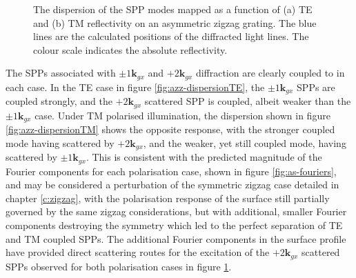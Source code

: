 \begin{figure}
\begin{center}
\end{center}
\caption[The dispersion of the SPP modes mapped as a function of TE and TM reflectivity on an asymmetric zigzag grating.]{The dispersion of the SPP modes mapped as a function of (a) TE and (b) TM reflectivity on an asymmetric zigzag grating. The blue lines are the calculated positions of the diffracted light lines. The colour scale indicates the absolute reflectivity.\label{fig:azz-dispersion}}
\end{figure}

The SPPs associated with $\pm1\mathbf{k}_{gx}$ and $+2\mathbf{k}_{gx}$ diffraction are clearly coupled to in each case. In the TE case in figure \ref{fig:azz-dispersionTE}, the $\pm1\mathbf{k}_{gx}$ SPPs are coupled strongly, and the $+2\mathbf{k}_{gx}$ scattered SPP is coupled, albeit weaker than the  $\pm1\mathbf{k}_{gx}$ case. Under TM polarised illumination, the dispersion shown in figure \ref{fig:azz-dispersionTM} shows the opposite response, with the stronger coupled mode having scattered by $+2\mathbf{k}_{gx}$, and the weaker, yet still coupled mode, having scattered by $\pm1\mathbf{k}_{gx}$. This is consistent with the predicted magnitude of the Fourier components for each polarisation case, shown in figure \ref{fig:as-fouriers}, and may be considered a perturbation of the symmetric zigzag case detailed in chapter \ref{c:zigzag}, with the polarisation response of the surface still partially governed by the same zigzag considerations, but with additional, smaller Fourier components destroying the symmetry which led to the perfect separation of TE and TM coupled SPPs. The additional Fourier components in the surface profile have provided direct scattering routes for the excitation of the $+2\mathbf{k}_{gx}$ scattered SPPs observed for both polarisation cases in figure \ref{fig:azz-dispersion}.


